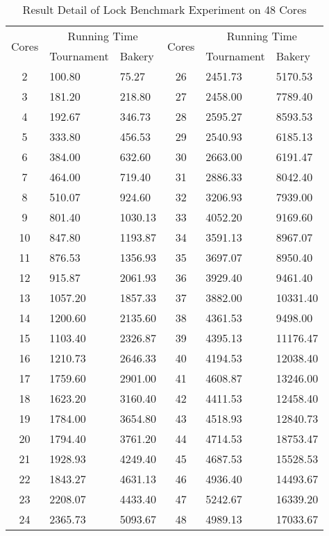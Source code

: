 \documentclass{article}
\begin{document}
\begin{table}[H]
    \caption{Result Detail of Lock Benchmark Experiment on 48 Cores}
    \label{exp_table_48}
    \centering
    \begin{tabular}{c|ll|c|ll}
        \toprule
        \multirow{2}{*}{Cores} & \multicolumn{2}{|c|}{Running Time} &
        \multirow{2}{*}{Cores} & \multicolumn{2}{|c}{Running Time} \\
                               & Tournament & Bakery & & Tournament & Bakery \\\midrule
        2 & 100.80 & 75.27 & 26 & 2451.73 & 5170.53 \\
        3 & 181.20 & 218.80 & 27 & 2458.00 & 7789.40 \\
        4 & 192.67 & 346.73 & 28 & 2595.27 & 8593.53 \\
        5 & 333.80 & 456.53 & 29 & 2540.93 & 6185.13 \\
        6 & 384.00 & 632.60 & 30 & 2663.00 & 6191.47 \\
        7 & 464.00 & 719.40 & 31 & 2886.33 & 8042.40 \\
        8 & 510.07 & 924.60 & 32 & 3206.93 & 7939.00 \\
        9 & 801.40 & 1030.13 & 33 & 4052.20 & 9169.60 \\
        10 & 847.80 & 1193.87 & 34 & 3591.13 & 8967.07 \\
        11 & 876.53 & 1356.93 & 35 & 3697.07 & 8950.40 \\
        12 & 915.87 & 2061.93 & 36 & 3929.40 & 9461.40 \\
        13 & 1057.20 & 1857.33 & 37 & 3882.00 & 10331.40 \\
        14 & 1200.60 & 2135.60 & 38 & 4361.53 & 9498.00 \\
        15 & 1103.40 & 2326.87 & 39 & 4395.13 & 11176.47 \\
        16 & 1210.73 & 2646.33 & 40 & 4194.53 & 12038.40 \\
        17 & 1759.60 & 2901.00 & 41 & 4608.87 & 13246.00 \\
        18 & 1623.20 & 3160.40 & 42 & 4411.53 & 12458.40 \\
        19 & 1784.00 & 3654.80 & 43 & 4518.93 & 12840.73 \\
        20 & 1794.40 & 3761.20 & 44 & 4714.53 & 18753.47 \\
        21 & 1928.93 & 4249.40 & 45 & 4687.53 & 15528.53 \\
        22 & 1843.27 & 4631.13 & 46 & 4936.40 & 14493.67 \\
        23 & 2208.07 & 4433.40 & 47 & 5242.67 & 16339.20 \\
        24 & 2365.73 & 5093.67 & 48 & 4989.13 & 17033.67 \\
        \bottomrule
    \end{tabular}
\end{table}
\end{document}

